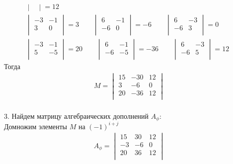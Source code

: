 \begin{enumerate}
\begin{gather*}
\begin{vmatrix}
				\end{vmatrix}
				= 12\qquad\\
				\begin{vmatrix}
					-3 & -1\\
					3 & 0\\
				\end{vmatrix}
				= 3\qquad
				\begin{vmatrix}
					6 & -1\\
					-6 & 0\\
				\end{vmatrix}
				= -6\qquad
				\begin{vmatrix}
					6 & -3\\
					-6 & 3\\
				\end{vmatrix}
				= 0\qquad\\
				\begin{vmatrix}
					-3 & -1\\
					5 & -5\\
				\end{vmatrix}
				= 20\qquad
				\begin{vmatrix}
					6 & -1\\
					-6 & -5\\
				\end{vmatrix}
				 = -36\qquad
				\begin{vmatrix}
					6 & -3\\
					-6 & 5\\
				\end{vmatrix}
				= 12
			\end{gather*}
			Тогда 
			\begin{gather*}
				M = 
				\begin{vmatrix}
					15 & -30 & 12\\
					3 & -6 & 0\\
					20 & -36 & 12\\
				\end{vmatrix}
			\end{gather*}
			\\
			3. Найдем матрицу алгебраических дополнений $A_{\phi}:$\\
			Домножим элементы $M$ на $(-1)^{i + j}$
			\begin{gather*}
			A_{\phi} = 
				\begin{vmatrix}
					15 & 30 & 12\\
					-3 & -6 & 0\\
					20 & 36 & 12\\
				\end{vmatrix}

\end{gather*}
\end{enumerate}
